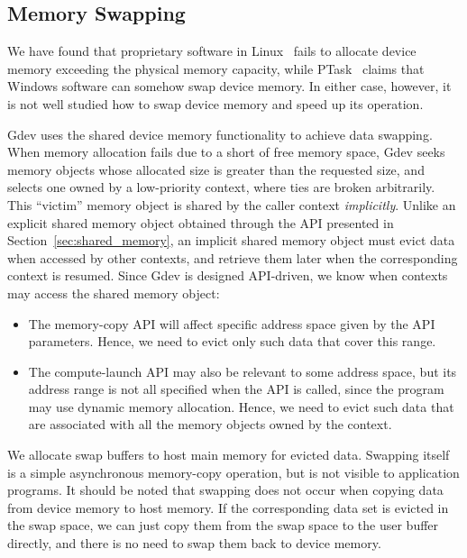 \vspace{-0.25em}
\subsection{Memory Swapping}
\label{sec:memory_swapping}
\vspace{-0.25em}

We have found that proprietary software in Linux~\cite{CUDA40} fails to
allocate device memory exceeding the physical memory capacity, while
PTask~\cite{Rossbach_SOSP11} claims that Windows software can somehow
swap device memory.
In either case, however, it is not well studied how to swap device
memory and speed up its operation.

Gdev uses the shared device memory functionality to achieve data
swapping.
When memory allocation fails due to a short of free memory
space, Gdev seeks memory objects whose allocated size is greater than
the requested size, and selects one owned by a low-priority context,
where ties are broken arbitrarily.
This ``victim'' memory object is shared by the caller context 
\textit{implicitly}.
Unlike an explicit shared memory object obtained through the API
presented in Section~\ref{sec:shared_memory}, an implicit shared memory
object must evict data when accessed by other contexts, and retrieve
them later when the corresponding context is resumed.
Since Gdev is designed API-driven, we know when contexts may access the
shared memory object:
\begin{itemize}
 \vspace{-0.25em}
 \item The memory-copy API will affect specific address space given by
       the API parameters.
       Hence, we need to evict only such data that cover this range.

 \vspace{-0.5em}
 \item The compute-launch API may also be relevant to some address
       space, but its address range is not all specified when the API is
       called, since the program may use dynamic memory allocation.
       Hence, we need to evict such data that are associated with all
       the memory objects owned by the context.
 \vspace{-0.25em}
\end{itemize}

We allocate swap buffers to host main memory for evicted data.
Swapping itself is a simple asynchronous memory-copy operation, but is
not visible to application programs.
It should be noted that swapping does not occur when copying data from
device memory to host memory.
If the corresponding data set is evicted in the swap space, we can just
copy them from the swap space to the user buffer directly, and there is
no need to swap them back to device memory.

